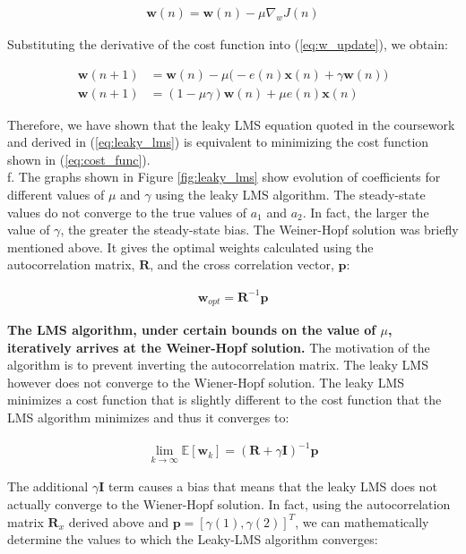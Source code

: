 \begin{align}
\textbf{w}(n) = \textbf{w}(n) - \mu \nabla_{w}J(n) \label{eq:w_update}
\end{align}

\noindent{}Substituting the derivative of the cost function into (\ref{eq:w_update}), we obtain:

\begin{align}
\textbf{w}(n+1) &= \textbf{w}(n) - \mu \Bigg( - e(n)\textbf{x}(n) +\gamma \textbf{w}(n)\Bigg)\nonumber\\
\textbf{w}(n+1) &= (1-\mu\gamma)\textbf{w}(n) + \mu e(n)\textbf{x}(n) \label{eq:leaky_lms}
\end{align}

\noindent{}Therefore, we have shown that the leaky LMS equation quoted in the coursework and derived in (\ref{eq:leaky_lms}) is equivalent to minimizing the cost function shown in (\ref{eq:cost_func}).\\

\noindent{}f. The graphs shown in Figure \ref{fig:leaky_lms} show evolution of coefficients for different values of $\mu$ and $\gamma$ using the leaky LMS algorithm. The steady-state values do not converge to the true values of $a_1$ and $a_2$. In fact, the larger the value of $\gamma$, the greater the steady-state bias. The Weiner-Hopf solution was briefly mentioned above. It gives the optimal weights calculated using the autocorrelation matrix, $\textbf{R}$, and the cross correlation vector, $\textbf{p}$:

\begin{align*}
\textbf{w}_{opt} = \textbf{R}^{-1}\textbf{p}
\end{align*}

\noindent{}\textbf{The LMS algorithm, under certain bounds on the value of $\mu$, iteratively arrives at the Weiner-Hopf solution.} The motivation of the algorithm is to prevent inverting the autocorrelation matrix. The leaky LMS however does not converge to the Wiener-Hopf solution. The leaky LMS minimizes a cost function that is slightly different to the cost function that the LMS algorithm minimizes and thus it converges to:

\begin{align*}
\lim_{k \rightarrow \infty} \mathbb{E}[\textbf{w}_{k}] = (\textbf{R} + \gamma\textbf{I})^{-1}\textbf{p}
\end{align*}

\noindent{}The additional $\gamma\textbf{I}$ term causes a bias that means that the leaky LMS does not actually converge to the Wiener-Hopf solution. In fact, using the autocorrelation matrix $\textbf{R}_x$ derived above and  $\textbf{p} = [\gamma(1), \gamma(2)]^T$, we can mathematically determine the values to which the Leaky-LMS algorithm converges:

